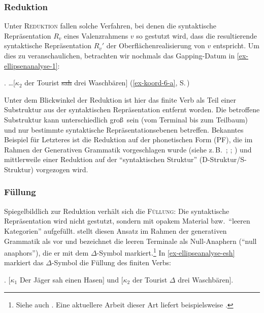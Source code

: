 \subsubsection*{Reduktion}

Unter \textsc{Reduktion} fallen solche Verfahren, bei denen die syntaktische Repräsentation $R_v$ eines Valenzrahmens $v$ so gestutzt wird, dass die resultierende syntaktische Repräsentation $R_v'$ der Oberflächenrealisierung von $v$ entspricht. Um dies zu veranschaulichen, betrachten wir nochmals das Gapping-Datum in \ref{ex-ellipsenanalyse-1}:

\ex.  \label{ex-ellipsenanalyse-1}\ldots [$\kappa_2$ der Tourist \sout{sah} drei Waschbären] \hfill (\ref{ex-koord-6-a}, S.\,\pageref{ex-koord-6-a})

Unter dem Blickwinkel der Reduktion ist hier das finite Verb als Teil einer Substruktur aus der syntaktischen Repräsentation entfernt worden. Die betroffene Substruktur kann unterschiedlich gro\ss\ sein (vom Terminal bis zum Teilbaum) und nur bestimmte syntaktische Repräsentationsebenen betreffen. Bekanntes Beispiel für Letzteres ist die Reduktion auf der phonetischen Form (PF), die im Rahmen der Generativen Grammatik vorgeschlagen wurde (siehe z.\,B.\ \citealt{Klein:93}; \citealt{Hartmann:00}; \citealt{Merchant:01}) und mittlerweile einer Reduktion auf der "`syntaktischen Struktur"' (D-Struktur/S-Struktur) vorgezogen wird.

\subsubsection*{Füllung}

Spiegelbildlich zur Reduktion verhält sich die \textsc{Füllung}: Die syntaktische Repräsentation wird nicht gestutzt, sondern mit opakem Material bzw.\ "`leeren Kategorien"' aufgefüllt. \citet[98f]{Wasow:72} stellt diesen Ansatz im Rahmen der generativen Grammatik als  vor und bezeichnet die leeren Terminale als Null-Anaphern ("`null anaphors"'), die er mit dem  $\Delta$-Symbol markiert.\footnote{Siehe auch \cite{Wasow:79}. Eine aktuellere Arbeit dieser Art liefert beispielsweise \cite{Johnson:01}.} In \ref{ex-ellipseanalyse-esh} markiert das $\Delta$-Symbol die Füllung des finiten Verbs:  

\ex. [$\kappa_1$ Der Jäger sah einen Hasen] und [$\kappa_2$ der Tourist $\Delta$ drei Waschbären].\label{ex-ellipseanalyse-esh}

